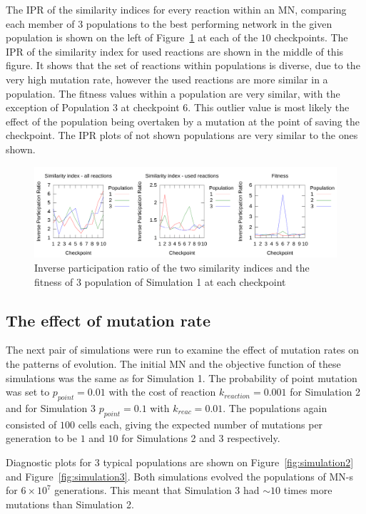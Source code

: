 \documentclass[a4paper,12pt]{article}
\begin{document}
The IPR of the similarity indices for every reaction within an MN, comparing each member of $3$ populations to the best performing network in the given population is shown on the left of Figure~\ref{fig:IPRsim1} at each of the $10$ checkpoints. The IPR of the similarity index for used reactions are shown in the middle of this figure. It shows that the set of reactions within populations is diverse, due to the very high mutation rate, however the used reactions are more similar in a population. The fitness values within a population are very similar, with the exception of Population $3$ at checkpoint $6$. This outlier value is most likely the effect of the population being overtaken by a mutation at the point of saving the checkpoint. The IPR plots of not shown populations are very similar to the ones shown. 

\begin{figure}[htpb]
	\centering
	\includegraphics[width=1\linewidth]{IPR_sim1.pdf}
	\caption{Inverse participation ratio of the two similarity indices and the fitness of $3$ population of Simulation 1 at each checkpoint}
	\label{fig:IPRsim1}
\end{figure}


\subsection{The effect of mutation rate}
\label{sub:the_probability_of_the_mutations}

The next pair of simulations were run to examine the effect of mutation rates on the patterns of evolution. The initial MN and the objective function of these simulations was the same as for Simulation 1. The probability of point mutation was set to $p_{point}=0.01$ with the cost of reaction $k_{reaction}=0.001$ for Simulation 2 and for Simulation 3 $p_{point}=0.1$ with $k_{reac}=0.01$. The populations again consisted of $100$ cells each, giving the expected number of mutations per generation to be $1$ and $10$ for Simulations 2 and 3 respectively. 

Diagnostic plots for $3$ typical populations are shown on Figure~\ref{fig:simulation2} and Figure~\ref{fig:simulation3}.
Both simulations evolved the populations of MN-s for $6\times 10^7$ generations. This meant that Simulation 3 had $\sim10$ times more mutations than Simulation 2. 
\end{document}
